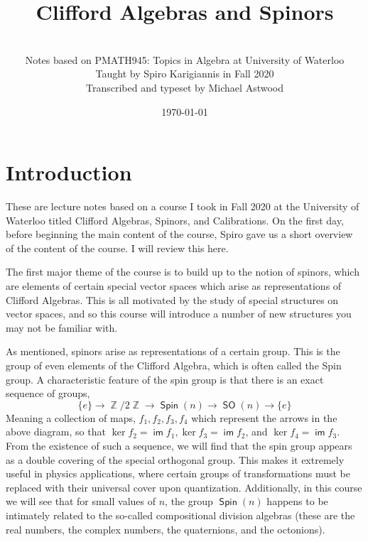 \documentclass[10pt]{article}
\title{Clifford Algebras and Spinors}
\author{\\Notes based on PMATH945: Topics in Algebra at University of Waterloo\\Taught by Spiro Karigiannis in Fall 2020\\
Transcribed and typeset by Michael Astwood}
\date{\today}
\numberwithin{equation}{section}
\DeclareMathOperator{\im}{\textsf{im}}
\DeclareMathOperator{\ZZ}{\mathbb{Z}}
\DeclareMathOperator{\Spin}{\textsf{Spin}}
\DeclareMathOperator{\SO}{\textsf{SO}}
\theoremstyle{definition}
\numberwithin{thm}{section}
\numberwithin{example}{section}
\numberwithin{defn}{section}
\numberwithin{lemma}{section}
\numberwithin{cor}{section}
\begin{document}
\clearpage
\thispagestyle{empty} %
\begin{titlingpage}
\maketitle
\end{titlingpage}

\pagebreak

\tableofcontents

\section*{Introduction} 

These are lecture notes based on a course I took in Fall 2020 at the University of Waterloo titled Clifford Algebras, Spinors, and Calibrations. On the first day, before beginning the main content of the course, Spiro gave us a short overview of the content of the course. I will review this here.

The first major theme of the course is to build up to the notion of spinors, which are elements of certain special vector spaces which arise as representations of Clifford Algebras. This is all motivated by the study of special structures on vector spaces, and so this course will introduce a number of new structures you may not be familiar with. 

As mentioned, spinors arise as representations of a certain group. This is the group of even elements of the Clifford Algebra, which is often called the Spin group. A characteristic feature of the spin group is that there is an exact sequence of groups,
\[\{e\} \to \ZZ/2\ZZ \to \Spin(n) \to \SO(n) \to \{e\}\]
Meaning a collection of maps, $f_1,f_2,f_3,f_4$ which represent the arrows in the above diagram, so that $\ker f_2 = \im f_1, \ker f_3 = \im f_2$, and $\ker f_4 = \im f_3$. From the existence of such a sequence, we will find that the spin group appears as a double covering of the special orthogonal group. This makes it extremely useful in physics applications, where certain groups of transformations must be replaced with their universal cover upon quantization. Additionally, in this course we will see that for small values of $n$, the group $\Spin(n)$ happens to be intimately related to the so-called compositional division algebras (these are the real numbers,  the complex numbers, the quaternions, and the octonions).
\end{document}
